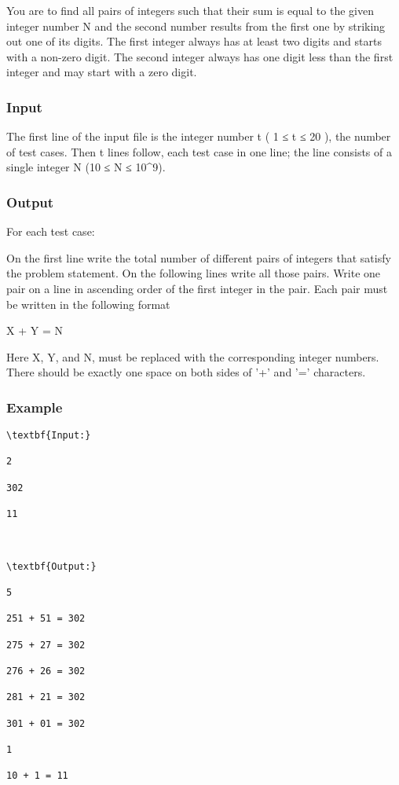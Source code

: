 



 You are to find all pairs of integers such that their sum is equal to the given integer number N and the second number results from the first one by striking out one of its digits. The first integer always has at least two digits and starts with a non-zero digit. The second integer always has one digit less than the first integer and may start with a zero digit.

 

\subsubsection{Input}



 The first line of the input file is the integer number t ( 1 ≤ t ≤ 20 ), the number of test cases. Then t lines follow, each test case in one line; the line consists of a single integer N (10 ≤ N ≤ 10\textasciicircum9).

 

\subsubsection{Output}



 For each test case: 



 On the first line write the total number of different pairs of integers that satisfy the problem statement. On the following lines write all those pairs. Write one pair on a line in ascending order of the first integer in the pair. Each pair must be written in the following format



X + Y = N



 

 Here X, Y, and N, must be replaced with the corresponding integer numbers. There should be exactly one space on both sides of '+' and '=' characters.

 

 

 

\subsubsection{Example}
\begin{verbatim}
\textbf{Input:}

2

302

11



\textbf{Output:}

5

251 + 51 = 302

275 + 27 = 302

276 + 26 = 302

281 + 21 = 302

301 + 01 = 302

1

10 + 1 = 11

\end{verbatim}